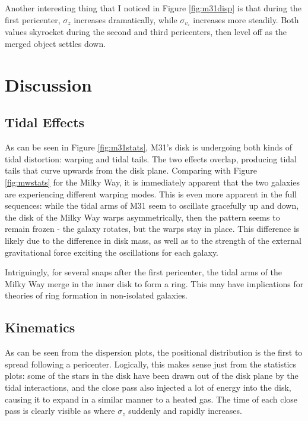 \documentclass[iop]{emulateapj}
\begin{document}
Another interesting thing that I noticed in Figure \ref{fig:m31disp} is that during the first pericenter, $\sigma_z$ increases dramatically, while $\sigma_{v_z}$ increases more steadily. Both values skyrocket during the second and third pericenters, then level off as the merged object settles down.

\section{Discussion}
\subsection{Tidal Effects}
As can be seen in Figure \ref{fig:m31stats}, M31's disk is undergoing both kinds of tidal distortion: warping and tidal tails. The two effects overlap, producing tidal tails that curve upwards from the disk plane. Comparing with Figure \ref{fig:mwstats} for the Milky Way, it is immediately apparent that the two galaxies are experiencing different warping modes. This is even more apparent in the full sequences: while the tidal arms of M31 seem to oscillate gracefully up and down, the disk of the Milky Way warps asymmetrically, then the pattern seems to remain frozen - the galaxy rotates, but the warps stay in place. This difference is likely due to the difference in disk mass, as well as to the strength of the external gravitational force exciting the oscillations for each galaxy.

Intriguingly, for several snaps after the first pericenter, the tidal arms of the Milky Way merge in the inner disk to form a ring. This may have implications for theories of ring formation in non-isolated galaxies.

\subsection{Kinematics}
As can be seen from the dispersion plots, the positional distribution is the first to spread following a pericenter. Logically, this makes sense just from the statistics plots: some of the stars in the disk have been drawn out of the disk plane by the tidal interactions, and the close pass also injected a lot of energy into the disk, causing it to expand in a similar manner to a heated gas. The time of each close pass is clearly visible as where $\sigma_z$ suddenly and rapidly increases.
\end{document}
